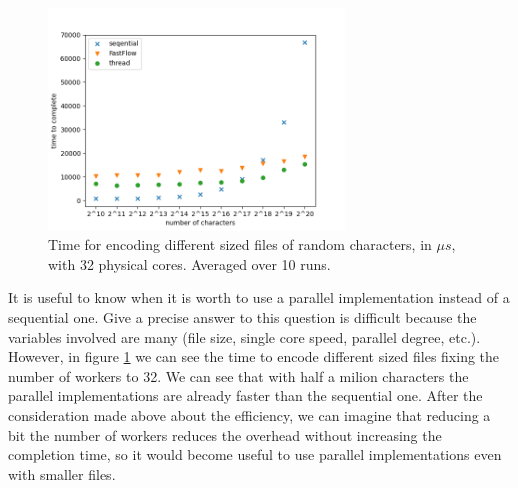 \documentclass[12pt, letterpaper]{article}
\begin{document}
\begin{figure}
    \centering
    \includegraphics[width=0.7\textwidth]{./images/small._files.png}
    \caption{Time for encoding different sized files of random characters, in $ \mu s$, with 32 physical cores. Averaged over 10 runs.}
    \label{fig:small_files}
\end{figure}

It is useful to know when it is worth to use a parallel implementation instead of a sequential one. Give a precise answer to this question is difficult because the variables involved are many (file size, single core speed, parallel degree, etc.). However, in figure \ref{fig:small_files} we can see the time to encode different sized files fixing the number of workers to 32. We can see that with half a milion characters the parallel implementations are already faster than the sequential one. After the consideration made above about the efficiency, we can imagine that reducing a bit the number of workers reduces the overhead without increasing the completion time, so it would become useful to use parallel implementations even with smaller files.




\newpage \FloatBarrier


\end{document}

